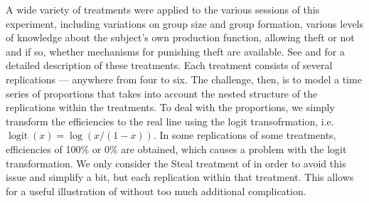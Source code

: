 \documentclass[graybox]{svmult}
\DeclareMathOperator{\logit}{logit}
\begin{document}
A wide variety of treatments were applied to the various sessions of this experiment, including variations on group size and group formation, various levels of knowledge about the subject's own production function, allowing theft or not and if so, whether mechanisms for punishing theft are available. See \citet{crockett2009exchange} and \citet{kimbrough2010exchange} for a detailed description of these treatments. Each treatment consists of several replications --- anywhere from four to six. The challenge, then, is to model a time series of proportions that takes into account the nested structure of the replications within the treatments. To deal with the proportions, we simply transform the efficiencies to the real line using the logit transofrmation, i.e. $\logit(x)=\log(x/(1-x))$. In some replications of some treatments, efficiencies of 100\% or 0\% are obtained, which causes a problem with the logit transformation. We only consider the Steal treatment of \citet{kimbrough2010exchange} in order to avoid this issue and simplify a bit, but each replication within that treatment. This allows for a useful illustration of \citet{simpson2014interweaving} without too much additional complication. 
\end{document}
